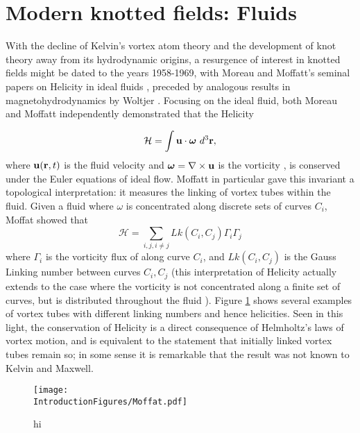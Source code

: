 \section{Modern knotted fields: Fluids}
\label{sec:Fluids}
With the decline of Kelvin's vortex atom theory and the development of knot theory away from its hydrodynamic origins, a resurgence of interest in knotted fields might be dated to the years 1958-1969, with Moreau and Moffatt's seminal papers on Helicity in ideal fluids \cite{Moreau,Moffat}, preceded by analogous results in magnetohydrodynamics by Woltjer \cite{Woltjer}. Focusing on the ideal fluid, both Moreau and Moffatt independently demonstrated that the Helicity

\begin{equation}
    \mathcal{H} = \int {\bf u} \cdot {\boldsymbol{\omega}} \ d^3 \bf r,
\end{equation}
where ${\bf u}({\bf r},t)$ is the fluid velocity and $\boldsymbol{\omega} = \nabla \times \bf u$ is the vorticity \cite{Saffman}, is conserved under the Euler equations of ideal flow. Moffatt in particular gave this invariant a topological interpretation: it measures the linking of vortex tubes within the fluid. Given a fluid where $\omega$ is concentrated along discrete sets of curves $C_i$, Moffat showed that
\begin{equation}
    \mathcal{H} = \sum_{i,j, i\neq j} Lk(C_i,C_j) \Gamma_i \Gamma_j 
\end{equation}
where $\Gamma_i$ is the vorticity flux of along curve $C_i$, and $Lk(C_i,C_j)$ is the Gauss Linking number between curves $C_i, C_j$ (this interpretation of Helicity actually extends to the case where the vorticity is not concentrated along a finite set of curves, but is distributed throughout the fluid \cite{Arnold,Berger,Berger}). Figure \ref{fig:Moffat} shows several examples of vortex tubes with different linking numbers and hence helicities. Seen in this light, the conservation of Helicity is a direct consequence of Helmholtz's laws of vortex motion, and is equivalent to the statement that initially linked vortex tubes remain so; in some sense it is remarkable that the result was not known to Kelvin and Maxwell.
\begin{figure}[htbp]
\centering
\texttt{[image: \\IntroductionFigures/Moffat.pdf]}
\caption{hi }
\label{fig:Moffat}
\end{figure}

